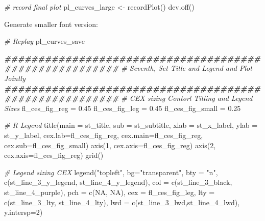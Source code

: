 \documentclass[
]{book}
\newenvironment{Shaded}{\begin{snugshade}}{\end{snugshade}}
\newcommand{\AttributeTok}[1]{\textcolor[rgb]{0.77,0.63,0.00}{#1}}
\newcommand{\CommentTok}[1]{\textcolor[rgb]{0.56,0.35,0.01}{\textit{#1}}}
\newcommand{\ConstantTok}[1]{\textcolor[rgb]{0.00,0.00,0.00}{#1}}
\newcommand{\DecValTok}[1]{\textcolor[rgb]{0.00,0.00,0.81}{#1}}
\newcommand{\DocumentationTok}[1]{\textcolor[rgb]{0.56,0.35,0.01}{\textbf{\textit{#1}}}}
\newcommand{\FloatTok}[1]{\textcolor[rgb]{0.00,0.00,0.81}{#1}}
\newcommand{\FunctionTok}[1]{\textcolor[rgb]{0.00,0.00,0.00}{#1}}
\newcommand{\NormalTok}[1]{#1}
\newcommand{\OtherTok}[1]{\textcolor[rgb]{0.56,0.35,0.01}{#1}}
\newcommand{\StringTok}[1]{\textcolor[rgb]{0.31,0.60,0.02}{#1}}
\begin{document}
\begin{Shaded}
\begin{Highlighting}[]
\CommentTok{\# record final plot}
\NormalTok{pl\_curves\_large }\OtherTok{\textless{}{-}} \FunctionTok{recordPlot}\NormalTok{()}
\FunctionTok{dev.off}\NormalTok{()}
\end{Highlighting}
\end{Shaded}

Generate smaller font version:

\begin{Shaded}
\begin{Highlighting}[]
\CommentTok{\# Replay}
\NormalTok{pl\_curves\_save}

\DocumentationTok{\#\#\#\#\#\#\#\#\#\#\#\#\#\#\#\#\#\#\#\#\#\#\#\#\#\#\#\#\#\#\#\#\#\#\#\#\#\#\#\#\#\#\#\#\#\#\#\#\#\#\#\#\#\#\#}
\CommentTok{\# Seventh, Set Title and Legend and Plot Jointly}
\DocumentationTok{\#\#\#\#\#\#\#\#\#\#\#\#\#\#\#\#\#\#\#\#\#\#\#\#\#\#\#\#\#\#\#\#\#\#\#\#\#\#\#\#\#\#\#\#\#\#\#\#\#\#\#\#\#\#\#}
\CommentTok{\# CEX sizing Contorl Titling and Legend Sizes}
\NormalTok{fl\_ces\_fig\_reg }\OtherTok{=} \FloatTok{0.45}
\NormalTok{fl\_ces\_fig\_leg }\OtherTok{=} \FloatTok{0.45}
\NormalTok{fl\_ces\_fig\_small }\OtherTok{=} \FloatTok{0.25}

\CommentTok{\# R Legend}
\FunctionTok{title}\NormalTok{(}\AttributeTok{main =}\NormalTok{ st\_title, }\AttributeTok{sub =}\NormalTok{ st\_subtitle, }\AttributeTok{xlab =}\NormalTok{ st\_x\_label, }\AttributeTok{ylab =}\NormalTok{ st\_y\_label,}
      \AttributeTok{cex.lab=}\NormalTok{fl\_ces\_fig\_reg,}
      \AttributeTok{cex.main=}\NormalTok{fl\_ces\_fig\_reg,}
      \AttributeTok{cex.sub=}\NormalTok{fl\_ces\_fig\_small)}
\FunctionTok{axis}\NormalTok{(}\DecValTok{1}\NormalTok{, }\AttributeTok{cex.axis=}\NormalTok{fl\_ces\_fig\_reg)}
\FunctionTok{axis}\NormalTok{(}\DecValTok{2}\NormalTok{, }\AttributeTok{cex.axis=}\NormalTok{fl\_ces\_fig\_reg)}
\FunctionTok{grid}\NormalTok{()}

\CommentTok{\# Legend sizing CEX}
\FunctionTok{legend}\NormalTok{(}\StringTok{"topleft"}\NormalTok{,}
       \AttributeTok{bg=}\StringTok{"transparent"}\NormalTok{,}
       \AttributeTok{bty =} \StringTok{"n"}\NormalTok{,}
       \FunctionTok{c}\NormalTok{(st\_line\_3\_y\_legend, st\_line\_4\_y\_legend),}
       \AttributeTok{col =} \FunctionTok{c}\NormalTok{(st\_line\_3\_black, st\_line\_4\_purple),}
       \AttributeTok{pch =} \FunctionTok{c}\NormalTok{(}\ConstantTok{NA}\NormalTok{, }\ConstantTok{NA}\NormalTok{),}
       \AttributeTok{cex =}\NormalTok{ fl\_ces\_fig\_leg,}
       \AttributeTok{lty =} \FunctionTok{c}\NormalTok{(st\_line\_3\_lty, st\_line\_4\_lty),}
       \AttributeTok{lwd =} \FunctionTok{c}\NormalTok{(st\_line\_3\_lwd,st\_line\_4\_lwd),}
       \AttributeTok{y.intersp=}\DecValTok{2}\NormalTok{)}
\end{Highlighting}
\end{Shaded}
\end{document}
